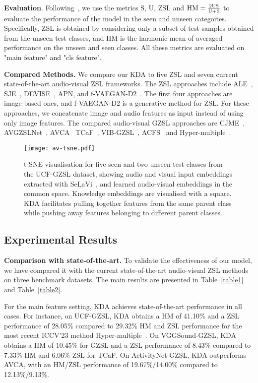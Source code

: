 \documentclass[10pt,twocolumn,letterpaper]{article}
\begin{document}
\noindent
\textbf{Evaluation}.
Following~\cite{AVCA}, we use the metrics S, U, ZSL and ${\rm HM = \frac{2US}{U+S}}$ to evaluate the performance of the model in the seen and unseen categories. Specifically, ZSL is obtained by considering only a subset of test samples obtained from the unseen test classes, and HM is the harmonic mean of averaged performance on the unseen and seen classes. All these metrics are evaluated on "main feature" and "cls feature".

\noindent
\textbf{Compared Methods.}
We compare our KDA to five ZSL and seven current state-of-the-art audio-visual ZSL frameworks. The ZSL approaches
include ALE~\cite{ALE}, SJE~\cite{SJE}, DEVISE~\cite{DEVISE}, APN\cite{APN}, and
f-VAEGAN-D2~\cite{fVAEGAND2}. The first four approaches are image-based ones, and f-VAEGAN-D2 is a generative method for
ZSL. For these approaches, we concatenate image and audio features as input instead of using only image features.
The compared audio-visual GZSL approaches are CJME~\cite{CJME},
AVGZSLNet~\cite{AVGZSLNet}, AVCA~\cite{AVCA} TCaF~\cite{TCaF}, VIB-GZSL~\cite{VIB}, ACFS~\cite{acfs} and Hyper-multiple~\cite{HyperbolicAV}.


\begin{figure*}[t]
	\centering\texttt{[image: av-tsne.pdf]}
	\caption{t-SNE visualisation for five seen and two unseen test classes from the UCF-GZSL dataset, showing audio and visual input embeddings extracted with SeLaVi~\cite{Asano_Patrick_Rupprecht_Vedaldi_2020}, and learned audio-visual embeddings in the common space. Knowledge embeddings are visualised with a square. KDA facilitates pulling together features from the same parent class while pushing away features belonging to different parent classes.}
	\label{tsne}
\end{figure*}

\subsection{Experimental Results}

\textbf{Comparison with state-of-the-art.}
To validate the effectiveness of our model, we have compared it with the current state-of-the-art audio-visual ZSL methods on
three benchmark datasets. The main results are presented in Table~\ref{table1} and Table~\ref{table2}. 

For the main feature setting, KDA achieves state-of-the-art performance in all cases.
For instance, on UCF-GZSL, KDA obtains a HM of 41.10\% and a ZSL performance of 28.05\% compared to 29.32\% HM and ZSL performance for the most recent ICCV'23 method Hyper-multiple~\cite{HyperbolicAV}.
On VGGSound-GZSL, KDA obtains a HM of 10.45\% for GZSL and a ZSL performance of 8.43\% compared to 7.33\% HM and 6.06\% ZSL for TCaF. On ActivityNet-GZSL, KDA outperforms AVCA, with an HM/ZSL performance of 19.67\%/14.00\% compared to 12.13\%/9.13\%.
\end{document}

